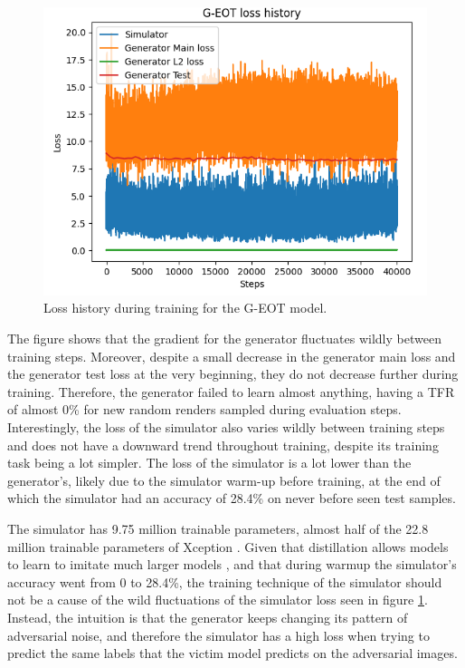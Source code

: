 \begin{figure}[H]
    \centering
    \includegraphics[width=1\textwidth]{graphics/g_eot_loss_exp1.PNG}
    \caption{Loss history during training for the G-EOT model.}
    \label{fig:g_eot_loss_history}
\end{figure}

The figure shows that the gradient for the generator fluctuates wildly between training steps. Moreover, despite a small decrease in the generator main loss and the generator test loss at the very beginning, they do not decrease further during training. Therefore, the generator failed to learn almost anything, having a TFR of almost 0\% for new random renders sampled during evaluation steps. Interestingly, the loss of the simulator also varies wildly between training steps and does not have a downward trend throughout training, despite its training task being a lot simpler. The loss of the simulator is a lot lower than the generator's, likely due to the simulator warm-up before training, at the end of which the simulator had an accuracy of 28.4\% on never before seen test samples.

The simulator has 9.75 million trainable parameters, almost half of the 22.8 million trainable parameters of Xception \cite{xception}. Given that distillation allows models to learn to imitate much larger models \cite{distillation}, and that during warmup the simulator's accuracy went from 0 to 28.4\%, the training technique of the simulator should not be a cause of the wild fluctuations of the simulator loss seen in figure \ref{fig:g_eot_loss_history}. Instead, the intuition is that the generator keeps changing its pattern of adversarial noise, and therefore the simulator has a high loss when trying to predict the same labels that the victim model predicts on the adversarial images.

